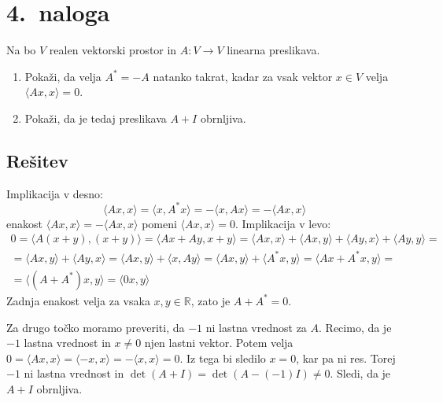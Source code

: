 \documentclass[a4,11pt]{article}
\newcommand{\R}{\mathbb{R}}
\begin{document}
\section*{4.~naloga}
    Na bo \(V\) realen vektorski prostor in \(A: V \to V\) linearna preslikava.
    \begin{enumerate}[label=(\alph*)]
        \item Pokaži, da velja \(A^* = -A\) natanko takrat, kadar za vsak vektor \(x \in V\) velja \(\langle Ax, x\rangle = 0\).
        \item Pokaži, da je tedaj preslikava \(A + I\) obrnljiva.
    \end{enumerate}

\subsection*{Rešitev}
    Implikacija v desno:
    \[\langle Ax, x\rangle = \langle x, A^*x\rangle = -\langle x, Ax\rangle = -\langle Ax, x\rangle\]
    enakost \(\langle Ax, x\rangle = -\langle Ax, x\rangle\) pomeni \(\langle Ax, x\rangle = 0\).
    Implikacija v levo:
    \begin{multline*}
        0 = \langle A(x + y), (x + y)\rangle = \langle Ax + Ay, x + y\rangle = \langle Ax, x\rangle + \langle Ax, y\rangle + \langle Ay, x\rangle + \langle Ay, y\rangle = \\
        = \langle Ax, y\rangle + \langle Ay, x\rangle = \langle Ax, y\rangle + \langle x, Ay\rangle = \langle Ax, y\rangle + \langle A^*x, y\rangle =
        \langle Ax + A^*x, y\rangle = \\ = \langle (A + A^*)x, y\rangle = \langle 0x, y\rangle
    \end{multline*}
    Zadnja enakost velja za vsaka \(x, y \in \R\), zato je \(A + A^* = 0\).

    Za drugo točko moramo preveriti, da \(-1\) ni lastna vrednost za \(A\). Recimo, da je \(-1\) lastna vrednost in \(x \ne 0\) njen lastni vektor.
    Potem velja \(0 = \langle Ax, x\rangle = \langle -x, x\rangle = -\langle x, x\rangle = 0\). Iz tega bi sledilo \(x = 0\), kar pa ni res. Torej \(-1\)
    ni lastna vrednost in \(\det(A + I) = \det(A - (-1) I) \ne 0\). Sledi, da je \(A + I\) obrnljiva.
\end{document}
